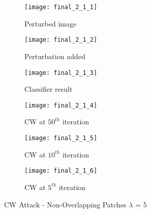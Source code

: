 \documentclass[11pt]{article}
\begin{document}
\begin{figure}[H]
\begin{subfigure}{.3\textwidth}
  \centering
  \texttt{[image: final\_2\_1\_1]}
  \caption{Perturbed image}
  \label{fig:}
\end{subfigure}
\begin{subfigure}{.3\textwidth}
  \centering
  \texttt{[image: final\_2\_1\_2]}
  \caption{Perturbation added}
  \label{fig:}
\end{subfigure}
\begin{subfigure}{.3\textwidth}
  \centering
  \texttt{[image: final\_2\_1\_3]}
  \caption{Classifier result}
  \label{fig:}
\end{subfigure}

\begin{subfigure}{.3\textwidth}
  \centering
  \texttt{[image: final\_2\_1\_4]}
  \caption{CW at $50^{th}$ iteration}
  \label{fig:}
\end{subfigure}
\begin{subfigure}{.3\textwidth}
  \centering
  \texttt{[image: final\_2\_1\_5]}
  \caption{CW at $10^{th}$ iteration}
  \label{fig:}
\end{subfigure}
\begin{subfigure}{.3\textwidth}
  \centering
  \texttt{[image: final\_2\_1\_6]}
  \caption{CW at $5^{th}$ iteration}
  \label{fig:}
\end{subfigure}

\caption{CW Attack - Non-Overlapping Patches $\lambda$ = 5}
\label{fig:}
\end{figure}
\end{document}

